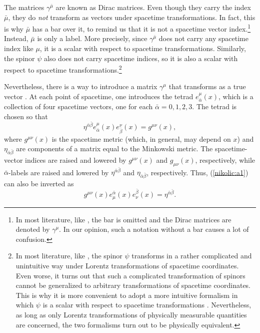 \documentclass[12pt,twoside]{report} %
\begin{document}
The matrices $\gamma^{\bar{\mu}}$ are known as Dirac matrices.
Even though they carry the index $\bar{\mu}$, they do {\em not} transform as
vectors under spacetime transformations. In fact, this is why $\bar{\mu}$ 
has a bar over it, to remind us that it is not a spacetime vector index.\footnote{
In most literature, like \cite{bd1}, the bar is omitted and the 
Dirac matrices are denoted by $\gamma^{\mu}$. In our opinion, such a notation
without a bar causes a lot of confusion.}
Instead, $\bar{\mu}$ is only a label.
More precisely, since $\gamma^{\bar{\mu}}$ does not carry any spacetime
index like $\mu$, it is a scalar with respect to spacetime transformations.
Similarly, the spinor $\psi$ also does not carry spacetime indices, so it is also
a scalar with respect to spacetime transformations.\footnote{
In most literature, like \cite{bd1}, the spinor $\psi$ transforms in a rather
complicated and unintuitive way under Lorentz transformations of spacetime
coordinates. Even worse, it turns out that such a complicated transformation of spinors
cannot be generalized to arbitrary transformations of spacetime coordinates.
This is why it is more convenient to adopt a more intuitive formalism in which
$\psi$ is a scalar with respect to spacetime transformations \cite{weinberg,birdel}.
Nevertheless, as long as only Lorentz transformations of physically measurable
quantities are concerned, the two formalisms turn out to be physically equivalent.}

Nevertheless, there is a way to introduce a matrix $\gamma^{\mu}$ that transforms 
as a true vector \cite{weinberg,birdel}.
At each point of spacetime, one introduces the tetrad $e^{\mu}_{\bar{\alpha}}(x)$, which
is a collection of four spacetime vectors, one for each $\bar{\alpha}=0,1,2,3$. 
The tetrad is chosen so that
\begin{equation}\label{nikolic:a1}
\eta^{\bar{\alpha}\bar{\beta}}e^{\mu}_{\bar{\alpha}}(x)e^{\nu}_{\bar{\beta}}(x)=
g^{\mu\nu}(x) ,
\end{equation}
where $g^{\mu\nu}(x)$ is the spacetime metric (which, in general, may depend on $x$)
and $\eta_{\bar{\alpha}\bar{\beta}}$ are 
components of a matrix equal to the Minkowski metric. 
The spacetime-vector indices are raised and lowered by $g^{\mu\nu}(x)$ and $g_{\mu\nu}(x)$,
respectively, while $\bar{\alpha}$-labels are raised and lowered by $\eta^{\bar{\alpha}\bar{\beta}}$ 
and $\eta_{\bar{\alpha}\bar{\beta}}$, respectively. Thus, (\ref{nikolic:a1}) can also be inverted as
\begin{equation}\label{nikolic:a2}
g^{\mu\nu}(x)e_{\mu}^{\bar{\alpha}}(x)e_{\nu}^{\bar{\beta}}(x)=
\eta^{\bar{\alpha}\bar{\beta}} .
\end{equation} 
\end{document}
